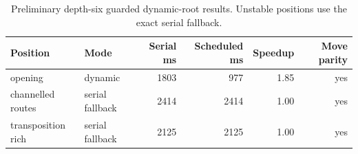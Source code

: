 \begin{table}[t]
\centering
\caption{Preliminary depth-six guarded dynamic-root results. Unstable positions use the exact serial fallback.}
\label{tab:phase-five-root}
\scriptsize
\begin{tabular}{llrrrr}
\toprule
Position & Mode & Serial ms & Scheduled ms & Speedup & Move parity \\
\midrule
opening & dynamic & 1803 & 977 & 1.85 & yes \\
channelled routes & serial fallback & 2414 & 2414 & 1.00 & yes \\
transposition rich & serial fallback & 2125 & 2125 & 1.00 & yes \\
\bottomrule
\end{tabular}
\end{table}
